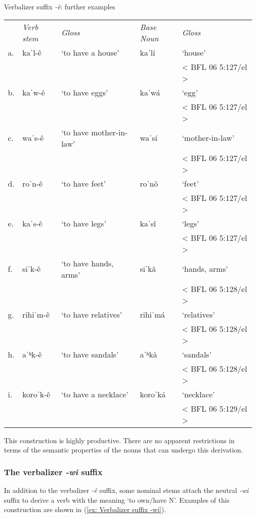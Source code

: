 \ea\label{ex: further examples of verbalizer -e}
{Verbalizer suffix \textit{-ê}: further examples}
\setlength{\tabcolsep}{3pt}
\begin{tabular}{lllll}
      & \textit{Verb stem} & \textit{Gloss} & \textit{Base Noun} & \textit{Gloss} \\
    a.& kaˈl-ê & {‘to have a house’}&{kaˈlí }&{‘house’}\\
       & & & & {< BFL 06 5:127/el >}\\
    b. & kaˈw-ê & {‘to have eggs’}&{kaˈwá}&{‘egg’}\\
    & & & &    {< BFL 06 5:127/el >}\\
    c. & {waˈs-ê}&{‘to have mother-in-law’}&{waˈsí}&{‘mother-in-law’}\\
    & & & &   {< BFL 06 5:127/el >}\\
    d.&{roˈn-ê}&{‘to have feet'}&{roˈnô}&{ ‘feet’}\\
    & & & &   {< BFL 06 5:127/el >}\\
    e.& {kaˈs-ê} &{‘to have legs’}&{kaˈsî}& {‘legs’}\\
    & & & &     {< BFL 06 5:127/el >}\\
    f. & {siˈk-ê}&{‘to have hands, arms’}&{siˈkâ}& {‘hands, arms’}\\
    & & & &    {< BFL 06 5:128/el >}\\
    g. & {rihiˈm-ê}&{‘to have relatives’}&{rihiˈmá}& {‘relatives’}\\
    & & & &   {< BFL 06 5:128/el >}\\
    h. & {aˈʰk-ê}&{‘to have sandals'}&{aˈʰkà}& {‘sandals'}\\
    & & & &{< BFL 06 5:128/el >}\\
    i. & {koroˈk-ê}&{‘to have a necklace’}&{koroˈká}& {‘necklace’}\\
    & & & & {< BFL 06 5:129/el >}\\
\end{tabular}
    \z

This construction is highly productive. There are no apparent restrictions in terms of the semantic properties of the nouns that can undergo this derivation.

\subsubsection{The verbalizer \textit{-wi} suffix}

In addition to the verbalizer \textit{-ê} suffix, some nominal stems attach the neutral \textit{-wi} suffix to derive a verb with the meaning `to own/have N'. Examples of this construction are shown in (\ref{ex: Verbalizer suffix -wi}).


